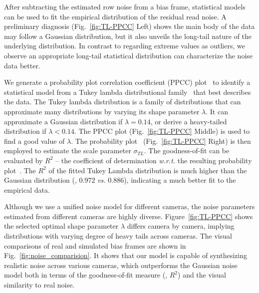 \documentclass[10pt,twocolumn,letterpaper]{article}
\begin{document}
After subtracting the estimated row noise from a bias frame, 
statistical models can be used to fit the empirical distribution of the residual read noise. A preliminary diagnosis (Fig.~\ref{fig:TL-PPCC} Left) shows the main
body of the data may follow a Gaussian distribution, but it also
unveils the long-tail nature of the underlying distribution. 
In contrast to regarding extreme values as outliers, 
we observe an appropriate long-tail statistical distribution can
characterize the noise data better. 

We generate a probability plot correlation
coefficient (PPCC) plot~\cite{Filliben1975The} to identify a statistical model
from a Tukey lambda distributional family~\cite{Joiner1971Some} that best
describes the data. The Tukey lambda distribution is a family of distributions
that can approximate many distributions by varying its shape parameter
$\lambda$. It can 
approximate a Gaussian distribution if $\lambda = 0.14$,  or derive a
heavy-tailed distribution if $\lambda < 0.14$.  
 The PPCC plot (Fig.~\ref{fig:TL-PPCC} Middle) is used to find a good value of $\lambda$. The
probability plot~\cite{Wilk1968Probability} (Fig.~\ref{fig:TL-PPCC} Right) is then employed to estimate the scale parameter $\sigma_{TL}$. 
The goodness-of-fit can be evaluated by $R^2$ -- the
coefficient of determination \emph{w.r.t.} the resulting probability plot~\cite{MORGAN201115}. 
The $R^2$ of the fitted Tukey
Lambda distribution is much higher than the Gaussian distribution (\eg, $0.972$ \emph{vs.}
$0.886$), indicating a much better fit to the empirical data.

Although we use a unified noise model for different cameras,  
the noise parameters estimated from different cameras are highly diverse.  Figure~\ref{fig:TL-PPCC} shows the selected optimal shape parameter $\lambda$ differs camera by camera, implying distributions with varying degree of heavy tails across cameras.  The visual comparisons of real and simulated bias frames are shown in Fig.~\ref{fig:noise_comparision}. It shows that our model is capable of synthesizing realistic noise across various cameras, which outperforms the Gaussian noise model both in terms of the goodness-of-fit measure (\ie, $R^2$) and the visual similarity to real noise.
\end{document}
